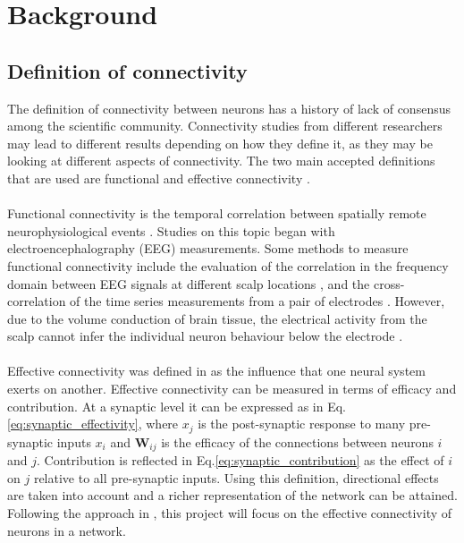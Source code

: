 
\graphicspath{ {background/} }
\chapter{Background}

\section{Definition of connectivity}

The definition of connectivity between neurons has a history of lack of consensus among the scientific community. Connectivity studies from different researchers may lead to different results depending on how they define it, as they may be looking at different aspects of connectivity. The two main accepted definitions that are used are functional and effective connectivity \cite{HORWITZ2003466}.
\\\\
Functional connectivity is the temporal correlation between spatially remote neurophysiological events \cite{friston1993functional}. Studies on this topic began with electroencephalography (EEG) measurements. Some methods to measure functional connectivity include the evaluation of the correlation in the frequency domain between EEG signals at different scalp locations \cite{pfurtscheller1999event}, and the cross-correlation of the time series measurements from a pair of electrodes \cite{gevins1985neurocognitive}. However, due to the volume conduction of brain tissue, the electrical activity from the scalp cannot infer the individual neuron behaviour below the electrode \cite{HORWITZ2003466}.
\\\\
Effective connectivity was defined in \cite{friston1993functional} as the influence that one neural system exerts on another. Effective connectivity can be measured in terms of efficacy and contribution. At a synaptic level it can be expressed as in Eq.\ref{eq:synaptic_effectivity}, where $x_{j}$ is the post-synaptic response to many pre-synaptic inputs $x_{i}$ and $\textbf{W}_{ij}$ is the efficacy of the connections between neurons $i$ and $j$. Contribution is reflected in Eq.\ref{eq:synaptic_contribution} as the effect of $i$ on $j$ relative to all pre-synaptic inputs. Using this definition, directional effects are taken into account and a richer representation of the network can be attained. Following the approach in \cite{alexandru2018estimating}, this project will focus on the effective connectivity of neurons in a network.
\\

